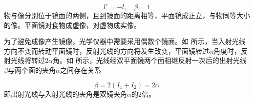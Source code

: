 \documentclass[cn,10pt,chinesefont=founder,math=newtx,cite=super,twoside]{elegantbook}
\begin{document}
\begin{equation}
l'=-l,\quad\beta=1
\end{equation}
物与像分别位于镜面的两侧，且到镜面的距离相等，平面镜成正立，与物同等大小的像。平面镜对食物成虚像，对虚物成实像。

为了避免成像产生镜像，光学仪器中需要采用偶数个镜面。如 所示，当入射光线方向不变而转动平面镜时，反射光线的方向将发生改变，平面镜转过$\alpha$角度时，反射光线将转过$2\alpha$角。如 所示，光线经双平面镜两个面相继反射一次后的出射光线$\beta$与两个面的夹角$\alpha$之间存在关系

\begin{equation}
\beta=2(I_1+I_2)=2\alpha
\end{equation}
即出射光线与入射光线的夹角是双镜夹角$\alpha$的$2$倍。
\end{document}
